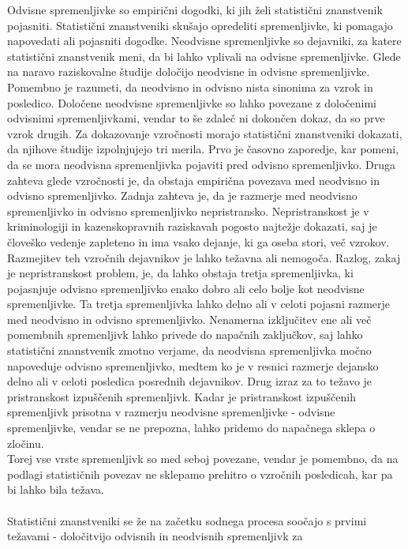 \documentclass[fin1, tisk]{fmfdelo}
\theoremstyle{definition} %
\theoremstyle{trditev} %
\theoremstyle{izrek}
\begin{document}
Odvisne spremenljivke so empirični dogodki, ki jih želi statistični znanstvenik pojasniti. Statistični znanstveniki skušajo opredeliti spremenljivke, ki pomagajo
napovedati ali pojasniti dogodke. Neodvisne spremenljivke so dejavniki, za katere statistični znanstvenik meni, da bi lahko vplivali na odvisne
spremenljivke. Glede na naravo raziskovalne študije določijo neodvisne in odvisne spremenljivke.\\
Pomembno je razumeti, da neodvisno in odvisno nista sinonima za vzrok in posledico. Določene neodvisne spremenljivke so lahko povezane z
določenimi odvisnimi spremenljivkami, vendar to še zdaleč ni dokončen dokaz, da so prve vzrok drugih. Za dokazovanje vzročnosti morajo
statistični znanstveniki dokazati, da njihove študije izpolnjujejo tri merila. Prvo je časovno zaporedje, kar pomeni, da se mora neodvisna spremenljivka
pojaviti pred odvisno spremenljivko. Druga zahteva glede vzročnosti je, da obstaja empirična povezava med neodvisno in odvisno spremenljivko.
Zadnja zahteva je, da je razmerje med neodvisno spremenljivko in odvisno spremenljivko nepristransko. Nepristranskost je v kriminologiji in
kazenskopravnih raziskavah pogosto najtežje dokazati, saj je človeško vedenje zapleteno in ima vsako dejanje, ki ga oseba stori, več vzrokov.
Razmejitev teh vzročnih dejavnikov je lahko težavna ali nemogoča. Razlog, zakaj je nepristranskost problem, je, da lahko obstaja tretja
spremenljivka, ki pojasnjuje odvisno spremenljivko enako dobro ali celo bolje kot neodvisne spremenljivke. Ta tretja spremenljivka lahko delno
ali v celoti pojasni razmerje med neodvisno in odvisno spremenljivko. Nenamerna izključitev ene ali več pomembnih spremenljivk lahko privede do
napačnih zaključkov, saj lahko statistični znanstvenik zmotno verjame, da neodvisna spremenljivka močno napoveduje odvisno spremenljivko, medtem ko je v
resnici razmerje dejansko delno ali v celoti posledica posrednih dejavnikov. Drug izraz za to težavo je pristranskost izpuščenih spremenljivk.
Kadar je pristranskost izpuščenih spremenljivk prisotna v razmerju neodvisne spremenljivke - odvisne spremenljivke, vendar se ne prepozna, lahko
pridemo do napačnega sklepa o zločinu.\\
Torej vse vrste spremenljivk so med seboj povezane, vendar je pomembno, da na podlagi statističnih povezav ne sklepamo prehitro o vzročnih posledicah,
kar pa bi lahko bila težava.\\\\
Statistični znanstveniki se že na začetku sodnega procesa soočajo s prvimi težavami - določitvijo odvisnih in neodvisnih spremenljivk za
\end{document}

